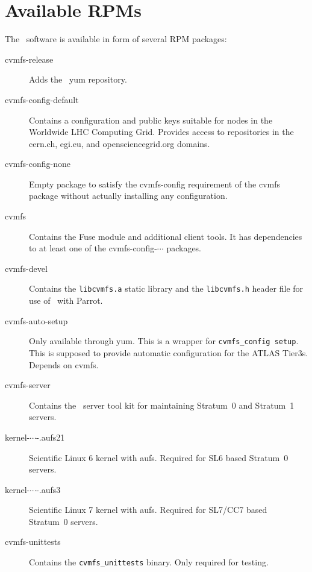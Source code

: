 \chapter{Available RPMs}
\label{apx:rpms}

The \cvmfs\ software is available in form of several RPM packages:
\begin{description}
	\item[cvmfs-release] Adds the \cvmfs\ yum repository.
	\item[cvmfs-config-default] Contains a configuration and public keys suitable \eg for nodes in the Worldwide LHC Computing Grid.  Provides access to repositories in the cern.ch, egi.eu, and opensciencegrid.org domains.
	\item[cvmfs-config-none] Empty package to satisfy the cvmfs-config requirement of the cvmfs package without actually installing any configuration.
	\item[cvmfs] Contains the Fuse module and additional client tools.  It has dependencies to at least one of the cvmfs-config-$\cdots$ packages.
	\item[cvmfs-devel] Contains the \texttt{libcvmfs.a} static library and the \texttt{libcvmfs.h} header file for use of \cvmfs\ with Parrot\cite{parrot05}.
	\item[cvmfs-auto-setup] Only available through yum. 
		This is a wrapper for \texttt{cvmfs\_config setup}. 
		This is supposed to provide automatic configuration for the ATLAS Tier3s.
		Depends on cvmfs.
	\item[cvmfs-server] Contains the \cvmfs\ server tool kit for maintaining Stratum~0 and Stratum~1 servers.
	\item[kernel-$\cdots$-.aufs21] Scientific Linux 6 kernel with aufs.
		Required for SL6 based Stratum~0 servers.
	\item[kernel-$\cdots$-.aufs3] Scientific Linux 7 kernel with aufs.
		Required for SL7/CC7 based Stratum~0 servers.
	\item[cvmfs-unittests] Contains the \texttt{cvmfs\_unittests} binary.  Only required for testing.
\end{description}
